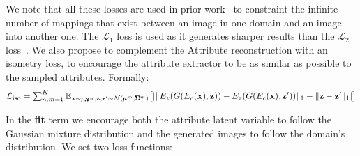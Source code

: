 \documentclass[runningheads]{llncs}
\begin{document}
We note that all these losses are used in prior work~\cite{choi2018stargan,huang2018multimodal,zhu2017unpaired,zhu2017toward} to constraint the infinite number of mappings that exist between an image in one domain and an image into another one. The $\mathcal{L}_1$ loss is used as it generates sharper results than the $\mathcal{L}_2$ loss~\cite{isola2017image}.
We also propose to complement the Attribute reconstruction with an isometry loss, to encourage the attribute extractor to be as similar as possible to the sampled attributes. Formally:
\begin{dmath*}
    \mathcal{L}_{\textrm{iso}} = \textstyle \sum_{n,m=1}^K\mathbb{E}_{\mathbf{x}\sim p_{\pmb{\mathcal{X}}^n}, \mathbf{z},\mathbf{z}'\sim {\cal N}(\pmb{\mu}^m, \pmb{\Sigma}^m)} \big[ |\| E_z(G(E_c(\mathbf{x}), \mathbf{z})) -  E_z(G(E_c(\mathbf{x}), \mathbf{z}'))\|_1 -  \|\mathbf{z}-\mathbf{z}' \|_1| \big]
\end{dmath*}

In the \textbf{fit} term we encourage both the attribute latent variable to follow the Gaussian mixture distribution and the generated images to follow the domain's distribution. We set two loss functions:
\end{document}
